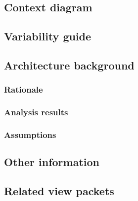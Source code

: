 \documentclass[a4paper,10pt]{article}
\begin{document}
\subsection{Context diagram}

\subsection{Variability guide}

\subsection{Architecture background}

\subsubsection{Rationale}

\subsubsection{Analysis results}

\subsubsection{Assumptions}

\subsection{Other information}

\subsection{Related view packets}
\end{document}
